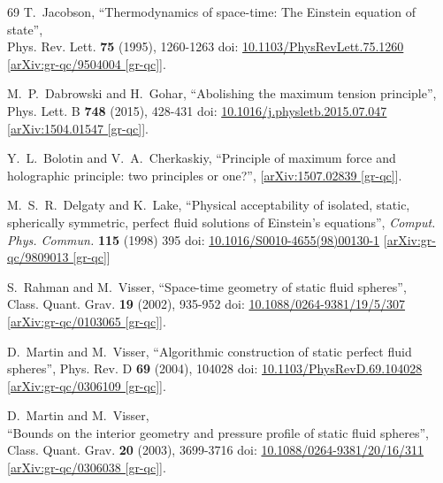 \documentclass[12pt]{article}
\begin{document}
\begin{thebibliography}{69}
T.~Jacobson,
``Thermodynamics of space-time: The Einstein equation of state'',\\
Phys. Rev. Lett. \textbf{75} (1995), 1260-1263
doi: \href{https://doi.org/10.1103/PhysRevLett.75.1260}{10.1103/PhysRevLett.75.1260}
[\href{https://www.arxiv.org/abs/gr-qc/9504004}{arXiv:gr-qc/9504004 [gr-qc]}].

M.~P.~Dabrowski and H.~Gohar,
``Abolishing the maximum tension principle'',\\
Phys. Lett. B \textbf{748} (2015), 428-431
doi:  \href{https://doi.org/10.1016/j.physletb.2015.07.047}{10.1016/j.physletb.2015.07.047}
[\href{https://www.arxiv.org/abs/1504.01547}{arXiv:1504.01547 [gr-qc]}].

Y.~L.~Bolotin and V.~A.~Cherkaskiy,
``Principle of maximum force and holographic principle: two principles or one?'',
[\href{https://www.arxiv.org/abs/1507.02839}{arXiv:1507.02839 [gr-qc]}].

M.~S.~R.~Delgaty and K.~Lake,
``Physical acceptability of isolated, static, spherically symmetric, perfect fluid
solutions of Einstein's equations'',
\textit{Comput. Phys. Commun.} \textbf{115} (1998) 395
doi: \href{https://doi.org/10.1016/S0010-4655(98)00130-1}{10.1016/S0010-4655(98)00130-1}
[\href{https://www.arxiv.org/abs/gr-qc/9809013}{arXiv:gr-qc/9809013 [gr-qc]}]

S.~Rahman and M.~Visser,
``Space-time geometry of static fluid spheres'',\\
Class. Quant. Grav. \textbf{19} (2002), 935-952
doi: \href{https://doi.org/10.1088/0264-9381/19/5/307}{10.1088/0264-9381/19/5/307}
[\href{https://www.arxiv.org/abs/gr-qc/0103065}{arXiv:gr-qc/0103065 [gr-qc]}].

\clearpage
{}
D.~Martin and M.~Visser,
``Algorithmic construction of static perfect fluid spheres'',
Phys. Rev. D \textbf{69} (2004), 104028
doi: \href{https://doi.org/10.1103/PhysRevD.69.104028}{10.1103/PhysRevD.69.104028}
[\href{https://www.arxiv.org/abs/gr-qc/0306109}{arXiv:gr-qc/0306109 [gr-qc]}].

D.~Martin and M.~Visser,\\
``Bounds on the interior geometry and pressure profile of static fluid spheres'',\\
Class. Quant. Grav. \textbf{20} (2003), 3699-3716
doi: \href{https://doi.org/10.1088/0264-9381/20/16/311}{10.1088/0264-9381/20/16/311}
[\href{https://www.arxiv.org/abs/gr-qc/0306038}{arXiv:gr-qc/0306038 [gr-qc]}].


\end{thebibliography}
\end{document}
